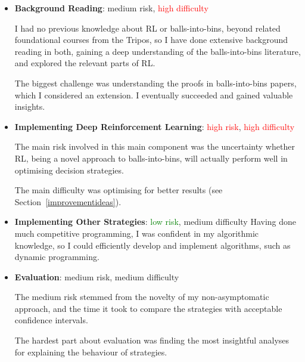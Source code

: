 \begin{itemize}

    \item \textbf{Background Reading}: \textcolor{YellowOrange}{medium risk}, \textcolor{Red}{high difficulty}
    
    I had no previous knowledge about RL or balls-into-bins, beyond related foundational courses from the Tripos, so I have done extensive background reading in both, gaining a deep understanding of the balls-into-bins literature, and explored the relevant parts of RL.
    
    The biggest challenge was understanding the proofs in balls-into-bins papers, which I considered an extension. I eventually succeeded and gained valuable insights.
    
    \item \textbf{Implementing Deep Reinforcement Learning}: \textcolor{red}{high risk}, \textcolor{red}{high difficulty}
    
    The main risk involved in this main component was the uncertainty whether RL, being a novel approach to balls-into-bins, will actually perform well in optimising decision strategies. 
    
    The main difficulty was optimising \DQL for better results (see Section~\ref{improvementideas}).
    
    \item \textbf{Implementing Other Strategies}: \textcolor{green}{low risk}, \textcolor{YellowOrange}{medium difficulty}
    Having done much competitive programming, I was confident in my algorithmic knowledge, so I could efficiently develop and implement algorithms, such as dynamic programming.
    
    \item \textbf{Evaluation}: \textcolor{YellowOrange}{medium risk}, \textcolor{YellowOrange}{medium difficulty}
    
    The medium risk stemmed from the novelty of my non-asymptomatic approach, and the time it took to compare the strategies with acceptable confidence intervals.
    
    The hardest part about evaluation was finding the most insightful analyses for explaining the behaviour of strategies.
    
\end{itemize}